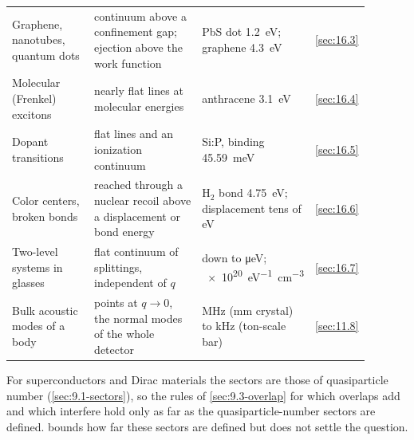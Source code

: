 \begin{table}[tbp]
\begin{tabular}{@{}p{0.24\linewidth}p{0.32\linewidth}p{0.23\linewidth}p{0.10\linewidth}@{}}
    Graphene, nanotubes, quantum dots & continuum above a confinement gap; ejection above the work function & PbS dot \SI{1.2}{eV}; graphene \SI{4.3}{eV} & \cref{sec:16.3} \\
    Molecular (Frenkel) excitons & nearly flat lines at molecular energies & anthracene \SI{3.1}{eV} & \cref{sec:16.4} \\
    Dopant transitions & flat lines and an ionization continuum & Si:P, binding \SI{45.59}{meV} & \cref{sec:16.5} \\
    Color centers, broken bonds & reached through a nuclear recoil above a displacement or bond energy & H$_2$ bond \SI{4.75}{eV}; displacement tens of eV & \cref{sec:16.6} \\
    Two-level systems in glasses & flat continuum of splittings, independent of $q$ & down to \si{\micro eV}; \SI{e20}{eV^{-1}.cm^{-3}} & \cref{sec:16.7} \\
    Bulk acoustic modes of a body & points at $q \to 0$, the normal modes of the whole detector & MHz (mm crystal) to kHz (ton-scale bar) & \cref{sec:11.8} \\
    \bottomrule
  \end{tabular}
\end{table}

For superconductors and Dirac materials the sectors are those of quasiparticle number (\cref{sec:9.1-sectors}), so the rules of \cref{sec:9.3-overlap} for which overlaps add and which interfere hold only as far as the quasiparticle-number sectors are defined.  bounds how far these sectors are defined but does not settle the question.
